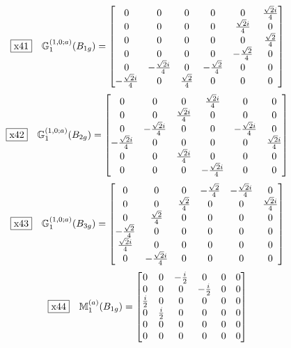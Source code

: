 \documentclass[fleqn,10pt,landscape]{jsarticle}
\begin{document}
\begin{dmath*}
\fbox{x41}\quad \mathbb{G}_{1}^{(1,0;a)}(B_{1g})=\begin{bmatrix} 0 & 0 & 0 & 0 & 0 & \frac{\sqrt{2} i}{4} \\ 0 & 0 & 0 & 0 & \frac{\sqrt{2} i}{4} & 0 \\ 0 & 0 & 0 & 0 & 0 & \frac{\sqrt{2}}{4} \\ 0 & 0 & 0 & 0 & - \frac{\sqrt{2}}{4} & 0 \\ 0 & - \frac{\sqrt{2} i}{4} & 0 & - \frac{\sqrt{2}}{4} & 0 & 0 \\ - \frac{\sqrt{2} i}{4} & 0 & \frac{\sqrt{2}}{4} & 0 & 0 & 0 \end{bmatrix}
\end{dmath*}
\begin{dmath*}
\fbox{x42}\quad \mathbb{G}_{1}^{(1,0;a)}(B_{2g})=\begin{bmatrix} 0 & 0 & 0 & \frac{\sqrt{2} i}{4} & 0 & 0 \\ 0 & 0 & \frac{\sqrt{2} i}{4} & 0 & 0 & 0 \\ 0 & - \frac{\sqrt{2} i}{4} & 0 & 0 & - \frac{\sqrt{2} i}{4} & 0 \\ - \frac{\sqrt{2} i}{4} & 0 & 0 & 0 & 0 & \frac{\sqrt{2} i}{4} \\ 0 & 0 & \frac{\sqrt{2} i}{4} & 0 & 0 & 0 \\ 0 & 0 & 0 & - \frac{\sqrt{2} i}{4} & 0 & 0 \end{bmatrix}
\end{dmath*}
\begin{dmath*}
\fbox{x43}\quad \mathbb{G}_{1}^{(1,0;a)}(B_{3g})=\begin{bmatrix} 0 & 0 & 0 & - \frac{\sqrt{2}}{4} & - \frac{\sqrt{2} i}{4} & 0 \\ 0 & 0 & \frac{\sqrt{2}}{4} & 0 & 0 & \frac{\sqrt{2} i}{4} \\ 0 & \frac{\sqrt{2}}{4} & 0 & 0 & 0 & 0 \\ - \frac{\sqrt{2}}{4} & 0 & 0 & 0 & 0 & 0 \\ \frac{\sqrt{2} i}{4} & 0 & 0 & 0 & 0 & 0 \\ 0 & - \frac{\sqrt{2} i}{4} & 0 & 0 & 0 & 0 \end{bmatrix}
\end{dmath*}
\begin{dmath*}
\fbox{x44}\quad \mathbb{M}_{1}^{(a)}(B_{1g})=\begin{bmatrix} 0 & 0 & - \frac{i}{2} & 0 & 0 & 0 \\ 0 & 0 & 0 & - \frac{i}{2} & 0 & 0 \\ \frac{i}{2} & 0 & 0 & 0 & 0 & 0 \\ 0 & \frac{i}{2} & 0 & 0 & 0 & 0 \\ 0 & 0 & 0 & 0 & 0 & 0 \\ 0 & 0 & 0 & 0 & 0 & 0 \end{bmatrix}
\end{dmath*}
\end{document}
